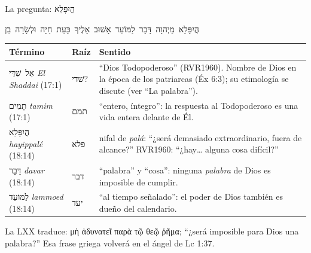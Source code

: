 \documentclass[hyperref={bookmarks=false},aspectratio=169]{beamer}
\newcommand{\heb}[1]{\mbox{\foreignlanguage{hebrew}{#1}}}
\newcommand{\grc}[1]{\foreignlanguage{ancientgreek}{#1}}
\begin{document}
\begin{frame}{La pregunta: \heb{הֲיִפָּלֵא}}
\begin{center}\heb{הֲיִפָּלֵא מֵיְהוָה דָּבָר לַמּוֹעֵד אָשׁוּב אֵלֶיךָ כָּעֵת חַיָּה וּלְשָׂרָה בֵן}\end{center}
\scriptsize\renewcommand{\arraystretch}{1.15}
\begin{tabular}{@{}>{\RaggedRight\arraybackslash}p{2.7cm}>{\RaggedRight\arraybackslash}p{1.1cm}>{\RaggedRight\arraybackslash}p{8.0cm}@{}}
\toprule
\textbf{Término} & \textbf{Raíz} & \textbf{Sentido} \\ \midrule
\heb{אֵל שַׁדַּי} \emph{El Shaddai} (17:1) & \heb{שׁדי}? & ``Dios Todopoderoso'' (RVR1960). Nombre de Dios en la época de los patriarcas (Éx 6:3); su etimología se discute (ver ``La palabra''). \\
\heb{תָמִים} \emph{tamim} (17:1) & \heb{תמם} & ``entero, íntegro'': la respuesta al Todopoderoso es una vida entera delante de Él. \\
\heb{הֲיִפָּלֵא} \emph{hayippalé} (18:14) & \heb{פלא} & nifal de \emph{palá}: ``¿será demasiado extraordinario, fuera de alcance?'' RVR1960: ``¿hay\ldots{} alguna cosa difícil?'' \\
\heb{דָּבָר} \emph{davar} (18:14) & \heb{דבר} & ``palabra'' y ``cosa'': ninguna \emph{palabra} de Dios es imposible de cumplir. \\
\heb{לַמּוֹעֵד} \emph{lammoed} (18:14) & \heb{יעד} & ``al tiempo señalado'': el poder de Dios también es dueño del calendario. \\
\bottomrule
\end{tabular}\par\smallskip
\small La LXX traduce: \grc{μὴ ἀδυνατεῖ παρὰ τῷ θεῷ ῥῆμα;} ``¿será imposible para Dios una palabra?'' Esa frase griega volverá en el ángel de Lc 1:37.
\end{frame}
\end{document}
